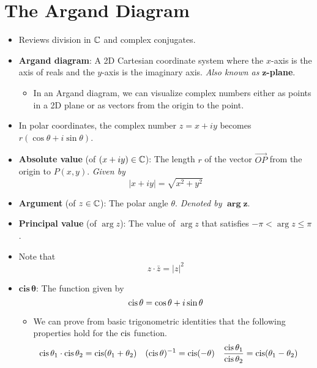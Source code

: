 \documentclass[../main.tex]{subfiles}
\begin{document}
\section{The Argand Diagram}
\begin{itemize}
    \item Reviews division in $\mathbb{C}$ and complex conjugates.
    \item \textbf{Argand diagram}: A 2D Cartesian coordinate system where the $x$-axis is the axis of reals and the $y$-axis is the imaginary axis. \emph{Also known as} \textbf{$\bm{z}$-plane}.
    \begin{itemize}
        \item In an Argand diagram, we can visualize complex numbers either as points in a 2D plane or as vectors from the origin to the point.
    \end{itemize}
    \item In polar coordinates, the complex number $z=x+iy$ becomes $r(\cos\theta+i\sin\theta)$.
    \item \textbf{Absolute value} (of $(x+iy)\in\mathbb{C}$): The length $r$ of the vector $\overrightarrow{OP}$ from the origin to $P(x,y)$. \emph{Given by}
    \begin{equation*}
        |x+iy| = \sqrt{x^2+y^2}
    \end{equation*}
    \item \textbf{Argument} (of $z\in\mathbb{C}$): The polar angle $\theta$. \emph{Denoted by} $\bm{\arg z}$.
    \item \textbf{Principal value} (of $\arg z$): The value of $\arg z$ that satisfies $-\pi<\arg z\leq\pi$.
    \item Note that
    \begin{equation*}
        z\cdot\bar{z} = |z|^2
    \end{equation*}
    \item $\textbf{cis}\,\bm{\theta}$: The function given by
    \begin{equation*}
        \operatorname{cis}\theta = \cos\theta+i\sin\theta
    \end{equation*}
    \begin{itemize}
        \item We can prove from basic trigonometric identities that the following properties hold for the $\operatorname{cis}$ function.
        \begin{align*}
            \cis\theta_1\cdot\cis\theta_2 &= \cis(\theta_1+\theta_2)&
            (\cis\theta)^{-1} &= \cis(-\theta)&
            \frac{\cis\theta_1}{\cis\theta_2} &= \cis(\theta_1-\theta_2)

\end{align*}
\end{itemize}
\end{itemize}
\end{document}
